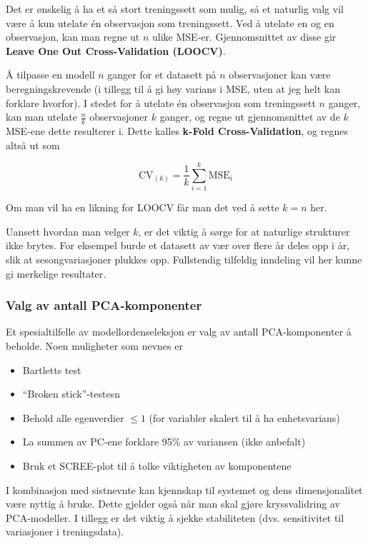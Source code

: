 Det er ønskelig å ha et så stort treningssett som mulig, så et naturlig valg vil være å kun utelate én observasjon som treningssett. Ved å utelate en og en observasjon, kan man regne ut $n$ ulike MSE-er. Gjennomsnittet av disse gir \textbf{Leave One Out Cross-Validation (LOOCV)}.

Å tilpasse en modell $n$ ganger for et datasett på $n$ observasjoner kan være beregningskrevende (i tillegg til å gi høy varians i MSE, uten at jeg helt kan forklare hvorfor). I stedet for å utelate én observasjon som treningssett $n$ ganger, kan man utelate $\frac{n}{k}$ observasjoner $k$ ganger, og regne ut gjennomsnittet av de $k$ MSE-ene dette resulterer i. Dette kalles \textbf{k-Fold Cross-Validation}, og regnes altså ut som

\begin{equation}
	\textrm{CV}_{(k)} = \frac{1}{k} \sum_{i=1}^{k} \textrm{MSE}_i
\end{equation}

Om man vil ha en likning for LOOCV får man det ved å sette $k = n$ her.

Uansett hvordan man velger $k$, er det viktig å sørge for at naturlige strukturer ikke brytes. For eksempel burde et datasett av vær over flere år deles opp i år, slik at sesongvariasjoner plukkes opp. Fullstendig tilfeldig inndeling vil her kunne gi merkelige resultater.

\subsubsection{Valg av antall PCA-komponenter}
Et spesialtilfelle av modellordenseleksjon er valg av antall PCA-komponenter å beholde. Noen muligheter som nevnes er
\begin{itemize}
	\item Bartletts test
	\item ``Broken stick''-testesn
	\item Behold alle egenverdier $\leq 1$ (for variabler skalert til å ha enhetsvarians)
	\item La summen av PC-ene forklare 95\% av variansen (ikke anbefalt)
	\item Bruk et SCREE-plot til å tolke viktigheten av komponentene
\end{itemize}
I kombinasjon med sistnevnte kan kjennskap til systemet og dens dimensjonalitet være nyttig å bruke. Dette gjelder også når man skal gjøre kryssvalidring av PCA-modeller. I tillegg er det viktig å sjekke stabiliteten (dvs. sensitivitet til variasjoner i treningsdata). 

